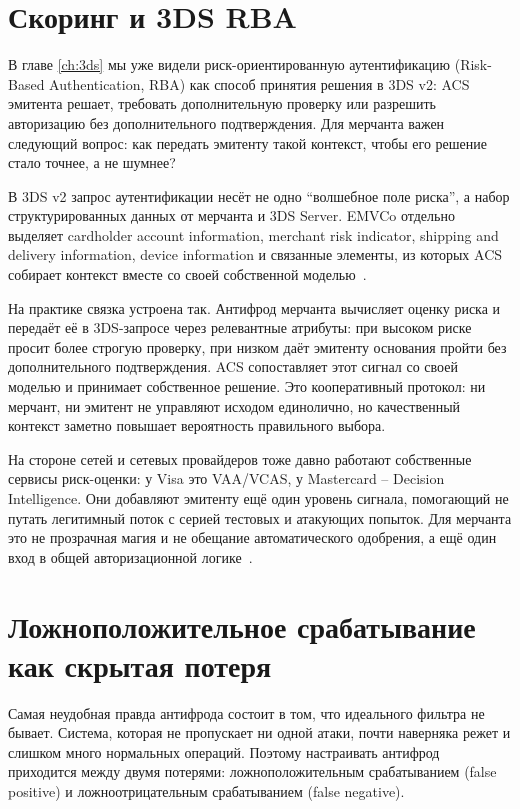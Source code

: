 \section{Скоринг и 3DS RBA}
\label{sec:fraud-3ds-rba}

В главе \ref{ch:3ds} мы уже видели риск-ориентированную аутентификацию
(Risk-Based Authentication, RBA) как способ принятия решения в 3DS v2:
ACS эмитента решает, требовать дополнительную проверку или
разрешить авторизацию без дополнительного подтверждения.
Для мерчанта важен следующий вопрос: как передать эмитенту такой
контекст, чтобы его решение стало точнее, а не шумнее?

В 3DS v2 запрос аутентификации несёт не одно \enquote{волшебное поле
риска}, а набор структурированных данных от мерчанта и 3DS Server.
EMVCo отдельно выделяет cardholder account information, merchant risk
indicator, shipping and delivery information, device information и
связанные элементы, из которых ACS собирает контекст вместе со своей
собственной моделью~\cite{emvco-3ds}\cite{emvco-3ds-tech-features}.

На практике связка устроена так. Антифрод мерчанта вычисляет оценку
риска и передаёт её в 3DS-запросе через релевантные атрибуты: при
высоком риске просит более строгую проверку, при низком даёт
эмитенту основания пройти без дополнительного подтверждения. ACS
сопоставляет этот сигнал со своей моделью и принимает собственное
решение. Это кооперативный протокол: ни мерчант, ни эмитент не
управляют исходом единолично, но качественный контекст заметно
повышает вероятность правильного выбора.

На стороне сетей и сетевых провайдеров тоже давно работают
собственные сервисы риск-оценки: у Visa это VAA/VCAS, у Mastercard --
Decision Intelligence. Они добавляют эмитенту ещё один уровень
сигнала, помогающий не путать легитимный поток с серией тестовых и
атакующих попыток. Для мерчанта это не прозрачная магия и не обещание
автоматического одобрения, а ещё один вход в общей авторизационной
логике~\cite{visa-auth-management-2020}\cite{mc-decision-intelligence}.

\section{Ложноположительное срабатывание как скрытая потеря}
\label{sec:fraud-false-positive}

Самая неудобная правда антифрода состоит в том, что идеального
фильтра не бывает. Система, которая не пропускает ни одной атаки,
почти наверняка режет и слишком много нормальных операций. Поэтому
настраивать антифрод приходится между двумя потерями:
ложноположительным срабатыванием (false positive) и ложноотрицательным
срабатыванием (false negative).

